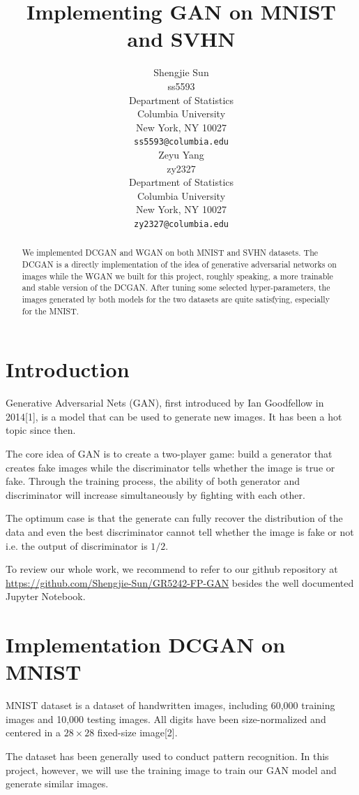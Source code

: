 \documentclass{article}
\title{Implementing GAN on MNIST and SVHN}
\author{%
  Shengjie Sun \\
  ss5593\\
  Department of Statistics\\
  Columbia University\\
  New York, NY 10027 \\
  \texttt{ss5593@columbia.edu} \\
  \And
  Zeyu Yang \\
  zy2327 \\
  Department of Statistics\\
  Columbia University\\
  New York, NY 10027 \\
  \texttt{zy2327@columbia.edu}
}
\begin{document}
\maketitle

\begin{abstract}
  We implemented DCGAN and WGAN on both MNIST and SVHN datasets.
  The DCGAN is a directly implementation of the idea of generative adversarial networks on images while the WGAN we built for this project, roughly speaking, a more trainable and stable version of the DCGAN.  
  After tuning some selected hyper-parameters, the images generated by both models for the two datasets are quite satisfying, especially for the MNIST.
\end{abstract}

\section{Introduction}

Generative Adversarial Nets (GAN), first introduced by Ian Goodfellow in 2014[1], is a model that can be used to generate new images. 
It has been a hot topic since then.

The core idea of GAN is to create a two-player game: build a generator that creates fake images while the discriminator tells whether the image is true or fake. Through the training process, the ability of both generator and discriminator will increase simultaneously by fighting with each other.

The optimum case is that the generate can fully recover the distribution of the data and even the best discriminator cannot tell whether the image is fake or not i.e. the output of discriminator is $1/2$. 

To review our whole work, we recommend to refer to our github repository at \href{https://github.com/Shengjie-Sun/GR5242-FP-GAN}{https://github.com/Shengjie-Sun/GR5242-FP-GAN} besides the well documented Jupyter Notebook.

\section{Implementation DCGAN on MNIST}

MNIST dataset is a dataset of handwritten images, including 60,000 training images and 10,000 testing images.
All digits have been size-normalized and centered in a $28\times 28$ fixed-size image[2].

The dataset has been generally used to conduct pattern recognition. 
In this project, however, we will use the training image to train our GAN model and generate similar images.
\end{document}

